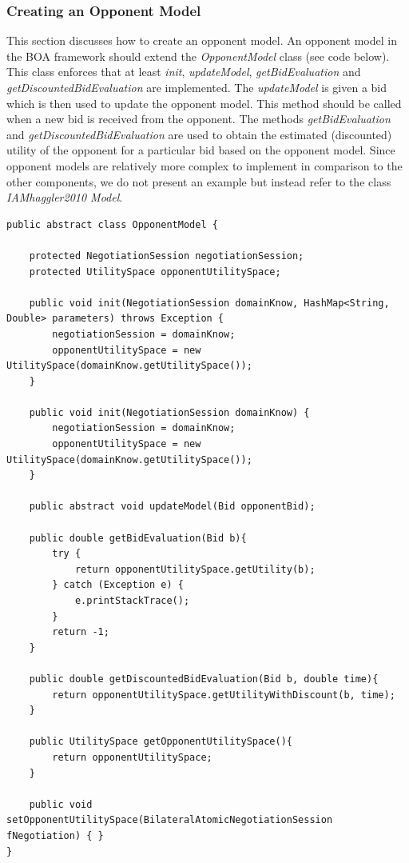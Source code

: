 \documentclass[]{article}
\begin{document}
\subsubsection{Creating an Opponent Model}
This section discusses how to create an opponent model. An opponent model in the BOA framework should extend the \textit{OpponentModel} class (see code below). This class enforces that at least \textit{init}, \textit{updateModel}, \textit{getBidEvaluation} and \textit{getDiscountedBidEvaluation} are implemented. The \textit{updateModel} is given a bid which is then used to update the opponent model.  This method should be called when a new bid is received from the opponent. The methods \textit{getBidEvaluation} and \textit{getDiscountedBidEvaluation} are used to obtain the estimated (discounted) utility of the opponent for a particular bid based on the opponent model. Since opponent models are relatively more complex to implement in comparison to the other components, we do not present an example but instead refer to the class \textit{IAMhaggler2010 Model}.\\

\begin{lstlisting}
public abstract class OpponentModel {
	
	protected NegotiationSession negotiationSession;
	protected UtilitySpace opponentUtilitySpace;
	
	public void init(NegotiationSession domainKnow, HashMap<String, Double> parameters) throws Exception {
		negotiationSession = domainKnow;
		opponentUtilitySpace = new UtilitySpace(domainKnow.getUtilitySpace());
	}
	
	public void init(NegotiationSession domainKnow) {
		negotiationSession = domainKnow;
		opponentUtilitySpace = new UtilitySpace(domainKnow.getUtilitySpace());
	}

	public abstract void updateModel(Bid opponentBid);

	public double getBidEvaluation(Bid b){
		try {
			return opponentUtilitySpace.getUtility(b);
		} catch (Exception e) {
			e.printStackTrace();
		}
		return -1;
	}
	
	public double getDiscountedBidEvaluation(Bid b, double time){
		return opponentUtilitySpace.getUtilityWithDiscount(b, time);
	}
	
	public UtilitySpace getOpponentUtilitySpace(){
		return opponentUtilitySpace;
	}

	public void setOpponentUtilitySpace(BilateralAtomicNegotiationSession fNegotiation) { }
}
\end{lstlisting}
\end{document}
